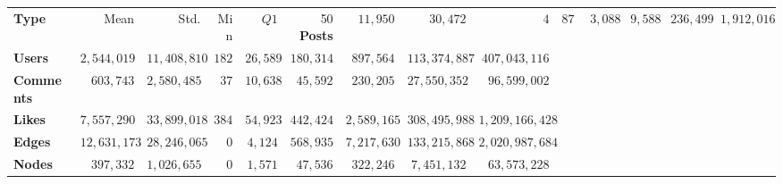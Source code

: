 \begin{tabular}{lrrrrrrrr}
\toprule
\textbf{Type} &         Mean &         Std. &   Min &     $Q1$ &       50%
\midrule
\textbf{Posts   } &     $11,950$ &     $30,472$ &   $4$ &    $874$ &   $3,088$ &     $9,588$ &     $236,499$ &     $1,912,016$ \\
\textbf{Users   } &  $2,544,019$ & $11,408,810$ & $182$ & $26,589$ & $180,314$ &   $897,564$ & $113,374,887$ &   $407,043,116$ \\
\textbf{Comments} &    $603,743$ &  $2,580,485$ &  $37$ & $10,638$ &  $45,592$ &   $230,205$ &  $27,550,352$ &    $96,599,002$ \\
\textbf{Likes   } &  $7,557,290$ & $33,899,018$ & $384$ & $54,923$ & $442,424$ & $2,589,165$ & $308,495,988$ & $1,209,166,428$ \\
\textbf{Edges   } & $12,631,173$ & $28,246,065$ &   $0$ &  $4,124$ & $568,935$ & $7,217,630$ & $133,215,868$ & $2,020,987,684$ \\
\textbf{Nodes   } &    $397,332$ &  $1,026,655$ &   $0$ &  $1,571$ &  $47,536$ &   $322,246$ &   $7,451,132$ &    $63,573,228$ \\
\bottomrule
\end{tabular}

